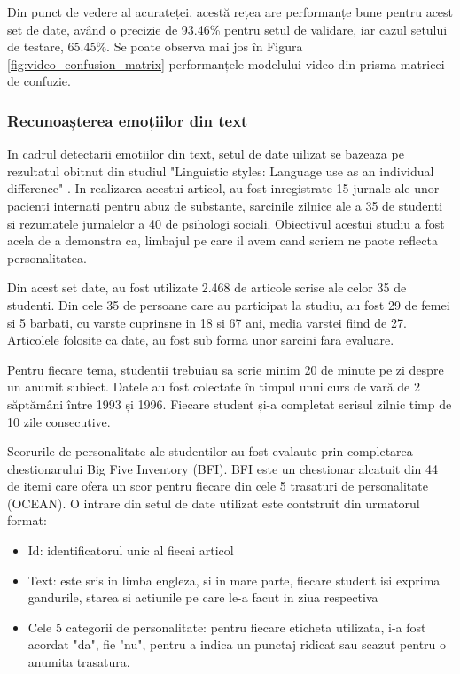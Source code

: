 \documentclass[a4paper, 12pt]{report}
\begin{document}
	Din punct de vedere al acurateței, acestă rețea are performanțe bune pentru acest set de date, având o precizie de 93.46\% pentru setul de validare, iar cazul setului de testare,  65.45\%. Se poate observa mai jos în Figura \ref{fig:video_confusion_matrix} performanțele modelului video din prisma matricei de confuzie.
	
	\clearpage
	\subsubsection{Recunoașterea emoțiilor din text}
	In cadrul detectarii emotiilor din text, setul de date uilizat se bazeaza pe rezultatul obitnut din studiul "Linguistic styles: Language use as an individual difference" \cite{text_dataset}. In realizarea acestui articol, au fost inregistrate 15 jurnale ale unor pacienti internati pentru abuz de substante, sarcinile zilnice ale a 35 de studenti si rezumatele jurnalelor a 40 de psihologi sociali. Obiectivul acestui studiu a fost acela de a demonstra ca, limbajul pe care il avem cand scriem ne paote reflecta personalitatea.
	
	Din acest set date, au fost utilizate 2.468 de articole scrise ale celor 35 de studenti. Din cele 35 de persoane care au participat la studiu, au fost 29 de femei si 5 barbati, cu varste cuprinsne in 18 si 67 ani, media varstei fiind de 27. Articolele folosite ca date, au fost sub forma unor sarcini fara evaluare. 
	
	Pentru fiecare tema, studentii trebuiau sa scrie minim 20 de minute pe zi despre un anumit subiect. Datele au fost colectate în timpul unui curs de vară de 2 săptămâni între 1993 și 1996. Fiecare student și-a completat scrisul zilnic timp de 10 zile consecutive. 
	
	Scorurile de personalitate ale studentilor au fost evalaute prin completarea chestionarului Big Five Inventory (BFI). BFI este un chestionar alcatuit din 44 de itemi care ofera un scor pentru fiecare din cele 5 trasaturi de personalitate (OCEAN). O intrare din setul de date utilizat este contstruit din urmatorul format: 
	\begin{itemize}
		\item Id: identificatorul unic al fiecai articol
		\item Text: este sris in limba engleza, si in mare parte, fiecare student isi exprima gandurile, starea si actiunile pe care le-a facut in ziua respectiva
		\item Cele 5 categorii de personalitate: pentru fiecare eticheta utilizata, i-a fost acordat "da", fie "nu", pentru a indica un punctaj ridicat sau scazut pentru o anumita trasatura.
	\end{itemize}
\end{document}
